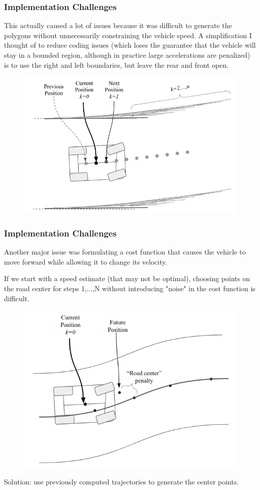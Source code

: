 \documentclass{beamer}
\begin{document}
\begin{frame}
\frametitle{Implementation Challenges}
This actually caused a lot of issues because it was difficult to generate the polygons without unnecessarily constraining the vehicle speed. A simplification I thought of to reduce coding issues (which loses the guarantee that the vehicle will stay in a bounded region, although in practice large accelerations are penalized) is to use the right and left boundaries, but leave the rear and front open.


\vspace{-0.5em}
\begin{figure}
	\includegraphics[width=0.7\linewidth]{road_final_bounds.png}
\end{figure}
\vspace{-0.5em}

\end{frame}

\begin{frame}
\frametitle{Implementation Challenges}
Another major issue was formulating a cost function that causes the vehicle to move forward while allowing it to change its velocity.

If we start with a speed estimate (that may not be optimal), choosing points on the road center for steps 1,...,N without introducing "noise" in the cost function is difficult.

\vspace{-0.5em}
\begin{figure}
	\includegraphics[width=0.6\linewidth]{centering_issue.png}
\end{figure}
\vspace{-0.5em}

Solution: use previously computed trajectories to generate the center points.

\end{frame}
\end{document}
